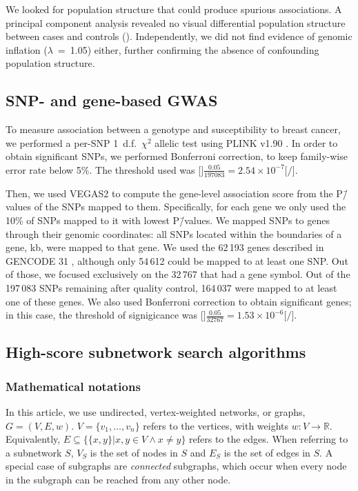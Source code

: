 \documentclass[10pt,letterpaper]{article}
\begin{document}
We looked for population structure that could produce spurious associations. A principal component analysis revealed no visual differential population structure between cases and controls (). Independently, we did not find evidence of genomic inflation (\(\lambda\)~=~1.05) either, further confirming the absence of confounding population structure.

\subsection{SNP- and gene-based GWAS}
\label{methods:conventional}

To measure association between a genotype and susceptibility to breast cancer, we performed a per-SNP 1~d.f.~$\chi^2$ allelic test using PLINK v1.90 \cite{chang_second-generation_2015}. In order to obtain significant SNPs, we performed Bonferroni correction, to keep family-wise error rate below 5\%. The threshold used was [$]\frac {0.05} {197083} = 2.54 \times 10^{-7}[/$].

Then, we used VEGAS2 \cite{mishra_vegas2:_2015} to compute the gene-level association score from the P\=/values of the SNPs mapped to them. Specifically, for each gene we only used the 10\% of SNPs mapped to it with lowest P\=/values. We mapped SNPs to genes through their genomic coordinates: all SNPs located within the boundaries of a gene,  kb, were mapped to that gene. We used the 62\,193 genes described in GENCODE 31 \cite{frankish_gencode_2019}, although only 54\,612 could be mapped to at least one SNP. Out of those, we focused exclusively on the 32\,767 that had a gene symbol. Out of the 197\,083 SNPs remaining after quality control, 164\,037 were mapped to at least one of these genes. We also used Bonferroni correction to obtain significant genes; in this case, the threshold of signigicance was [$]\frac {0.05} {32767} = 1.53 \times 10^{-6}[/$]. 

\subsection{High-score subnetwork search algorithms}

\subsubsection{Mathematical notations}
\label{methods:notation}
In this article, we use undirected, vertex-weighted networks, or graphs, $G = (V,E,w)$. $V = \{v_{1}, \dots{}, v_{n}\}$ refers to the vertices, with weights $w: V \rightarrow \mathbb{R}$. Equivalently, $E \subseteq \{\{x,y\} | x,y \in V \wedge x \neq y\}$ refers to the edges. When referring to a subnetwork $S$, $V_{S}$ is the set of nodes in $S$ and $E_{S}$ is the set of edges in $S$. A special case of subgraphs are \emph{connected} subgraphs, which occur when every node in the subgraph can be reached from any other node.
\end{document}
